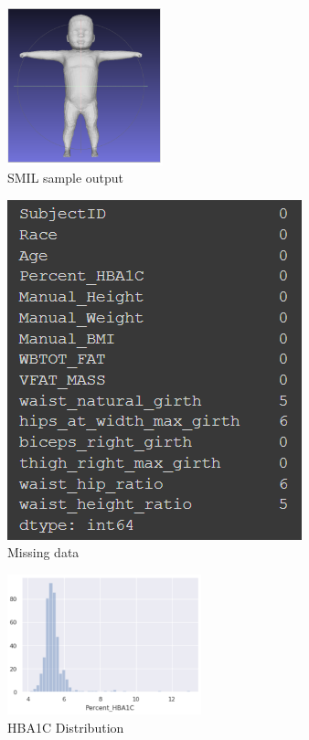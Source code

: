 \begin{figure}[h]
        \caption{SMIL sample output}
        \centering
        \includegraphics[width=0.4\textwidth]{images/smil.png}
\end{figure}

\begin{figure}[!htb]
        \caption{Missing data}
        \centering
        \includegraphics[]{images/missing_data.png}
\end{figure}

\begin{figure}[!htb]
        \caption{HBA1C Distribution}
        \centering
        \includegraphics[width=0.5\textwidth]{images/hba1c.png}
\end{figure}

